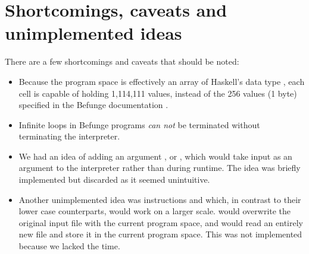 \documentclass[12pt, a4paper]{article}
\begin{document}
\section{Shortcomings, caveats and unimplemented ideas}



There are a few shortcomings and caveats that should be noted:

\begin{itemize}

\item Because the program space is effectively an array of Haskell's data type , each cell is capable of holding 1,114,111 values, instead of the 256 values (1 byte) specified in the Befunge documentation \cite{befunge93}.

\item Infinite loops in Befunge programs \emph{can not} be terminated without terminating the interpreter.

\item We had an idea of adding an argument , or , which would take input as an argument to the interpreter rather than during runtime. The idea was briefly implemented but discarded as it seemed unintuitive.

\item Another unimplemented idea was instructions  and  which, in contrast to their lower case counterparts, would work on a larger scale.  would overwrite the original input file with the current program space, and  would read an entirely new file and store it in the current program space. This was not implemented because we lacked the time.

\end{itemize}

\vfill



\end{document}
